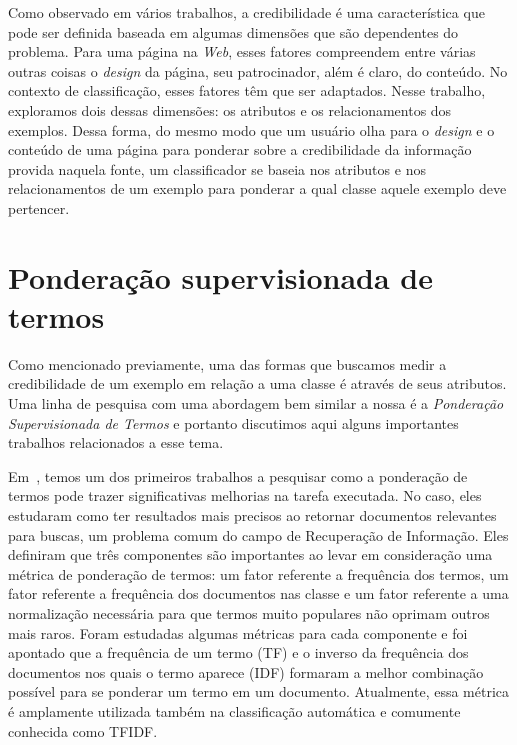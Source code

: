 Como observado em vários trabalhos, a credibilidade é uma característica que pode ser definida baseada em algumas dimensões que são dependentes do problema. Para uma página na \textit{Web}, esses fatores compreendem entre várias outras coisas o \textit{design} da página, seu patrocinador, além é claro, do conteúdo. No contexto de classificação, esses fatores têm que ser adaptados. Nesse trabalho, exploramos dois dessas dimensões: os atributos e os relacionamentos dos exemplos. Dessa forma, do mesmo modo que um usuário olha para o \textit{design} e o conteúdo de uma página para ponderar sobre a credibilidade da informação provida naquela fonte, um classificador se baseia nos atributos e nos relacionamentos de um exemplo para ponderar a qual classe aquele exemplo deve pertencer. 



\section{Ponderação supervisionada de termos}
\label{sec::supervised}

Como mencionado previamente, uma das formas que buscamos medir a credibilidade de um exemplo em relação a uma classe é através de seus atributos. Uma linha de pesquisa com uma abordagem bem similar a nossa é a \textit{Ponderação Supervisionada de Termos} e portanto discutimos aqui alguns importantes trabalhos relacionados a esse tema.

Em~\cite{Salton88}, temos um dos primeiros trabalhos a pesquisar como a ponderação de termos pode trazer significativas melhorias na tarefa executada. 
No caso, eles estudaram como ter resultados mais precisos ao retornar documentos relevantes para buscas, um problema comum do campo de Recuperação de Informação. 
Eles definiram que três componentes são importantes ao levar em consideração uma métrica de ponderação de termos: um fator referente a frequência dos termos, um fator referente a frequência dos documentos nas classe e um fator referente a uma normalização necessária para que termos muito populares não oprimam outros mais raros.
Foram estudadas algumas métricas para cada componente e foi apontado que a frequência de um termo (\textsc{TF}) e o inverso da frequência dos documentos nos quais o termo aparece (\textsc{IDF}) formaram a melhor combinação possível para se ponderar um termo em um documento. 
Atualmente, essa métrica é amplamente utilizada também na classificação automática e comumente conhecida como \textsc{TFIDF}.

